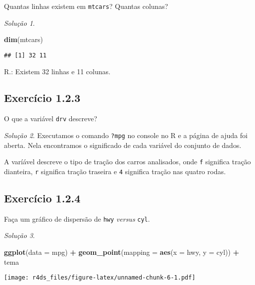 \documentclass[
]{book}
\newenvironment{Shaded}{\begin{snugshade}}{\end{snugshade}}
\newcommand{\AttributeTok}[1]{\textcolor[rgb]{0.13,0.29,0.53}{#1}}
\newcommand{\FunctionTok}[1]{\textcolor[rgb]{0.13,0.29,0.53}{\textbf{#1}}}
\newcommand{\NormalTok}[1]{#1}
\newcommand{\SpecialCharTok}[1]{\textcolor[rgb]{0.81,0.36,0.00}{\textbf{#1}}}
\theoremstyle{definition}
\theoremstyle{definition}
\theoremstyle{definition}
\theoremstyle{definition}
\theoremstyle{remark}
\newtheorem*{solution}{Solução}
\begin{document}
Quantas linhas existem em \texttt{mtcars}? Quantas colunas?

\begin{solution}
\leavevmode

\begin{Shaded}
\begin{Highlighting}[]
\FunctionTok{dim}\NormalTok{(mtcars)}
\end{Highlighting}
\end{Shaded}

\begin{verbatim}
## [1] 32 11
\end{verbatim}

R.: Existem 32 linhas e 11 colunas.

\end{solution}

\hypertarget{exr1-2-3}{%
\subsection*{Exercício 1.2.3}\label{exr1-2-3}}

O que a variável \texttt{drv} descreve?

\begin{solution}
Executamos o comando \texttt{?mpg} no console no R e a página de ajuda foi aberta. Nela encontramos o significado de cada variável do conjunto de dados.

A varíável descreve o tipo de tração dos carros analisados, onde \texttt{f} significa tração dianteira, \texttt{r} significa tração traseira e \texttt{4} significa tração nas quatro rodas.
\end{solution}

\hypertarget{ex1-2-4}{%
\subsection*{Exercício 1.2.4}\label{ex1-2-4}}

Faça um gráfico de dispersão de \texttt{hwy} \emph{versus} \texttt{cyl}.

\begin{solution}
\leavevmode

\begin{Shaded}
\begin{Highlighting}[]
\FunctionTok{ggplot}\NormalTok{(}\AttributeTok{data =}\NormalTok{ mpg) }\SpecialCharTok{+}
    \FunctionTok{geom\_point}\NormalTok{(}\AttributeTok{mapping =} \FunctionTok{aes}\NormalTok{(}\AttributeTok{x =}\NormalTok{ hwy, }\AttributeTok{y =}\NormalTok{ cyl)) }\SpecialCharTok{+}
\NormalTok{    tema}
\end{Highlighting}
\end{Shaded}

\texttt{[image: r4ds\_files/figure-latex/unnamed-chunk-6-1.pdf]}

\end{solution}
\end{document}
